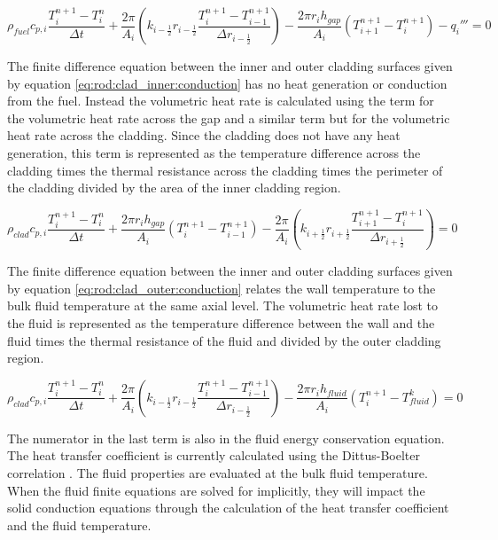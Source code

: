 \begin{equation}
	\label{eq:rod:fuel_surface:conduction}
	  \rho_{fuel}c_{p,i}\frac{T^{n+1}_{i}-T^{n}_{i}}{\Delta t}
	+ \frac{2\pi}{A_{i}}
 	    \left(k_{i-\frac{1}{2}}r_{i-\frac{1}{2}}
		\frac{T^{n+1}_{i}-T^{n+1}_{i-1}}{\Delta r_{i-\frac{1}{2}}}\right)
	- \frac{2\pi r_{i}h_{gap}}{A_{i}}\left(T^{n+1}_{i+1}-T^{n+1}_{i}\right)
	- q_{i}'''
	= 0
\end{equation}

The finite difference equation between the inner and outer cladding surfaces
given by equation \ref{eq:rod:clad_inner:conduction} has no heat generation or
conduction from the fuel. Instead the  volumetric heat rate is calculated using
the term for the volumetric heat rate  across the gap and a similar term but for
the volumetric heat rate across the cladding. Since the cladding does not have
any heat generation, this  term is represented as the temperature difference
across the cladding times the thermal resistance across the cladding  times the
perimeter of the cladding divided by the area of the inner cladding region.

\begin{equation}
	\label{eq:rod:clad_inner:conduction}
	  \rho_{clad}c_{p,i}\frac{T^{n+1}_{i}-T^{n}_{i}}{\Delta t}
	+ \frac{2\pi r_{i}h_{gap}}{A_{i}}\left(T^{n+1}_{i}-T^{n+1}_{i-1}\right)
	- \frac{2\pi}{A_{i}}
 	    \left(k_{i+\frac{1}{2}}r_{i+\frac{1}{2}}
		\frac{T^{n+1}_{i+1}-T^{n+1}_{i}}{\Delta r_{i+\frac{1}{2}}}\right)
	= 0
\end{equation}

The finite difference equation between the inner and outer cladding surfaces
given by equation \ref{eq:rod:clad_outer:conduction} relates the wall
temperature to the bulk fluid temperature at the same axial level. The
volumetric heat rate lost to the fluid is represented as the temperature
difference between the wall and the fluid times the thermal resistance of the
fluid and divided by the outer cladding region.

\begin{equation}
	\label{eq:rod:clad_outer:conduction}
	  \rho_{clad}c_{p,i}\frac{T^{n+1}_{i}-T^{n}_{i}}{\Delta t}
	+ \frac{2\pi}{A_{i}}
 	    \left(k_{i-\frac{1}{2}}r_{i-\frac{1}{2}}
		\frac{T^{n+1}_{i}-T^{n+1}_{i-1}}{\Delta r_{i-\frac{1}{2}}}\right)
    - \frac{2\pi r_{i}h_{fluid}}{A_{i}}\left(T^{n+1}_{i}-T^{k}_{fluid}\right)
	= 0
\end{equation}

The numerator in the last term is also in the fluid energy conservation
equation. The heat transfer coefficient is currently calculated using the
Dittus-Boelter correlation \cite{Incropera1998}. The fluid properties are
evaluated at the bulk fluid temperature. When the fluid finite equations are
solved for implicitly, they will impact the solid conduction equations through
the calculation of the heat transfer coefficient and the fluid temperature.